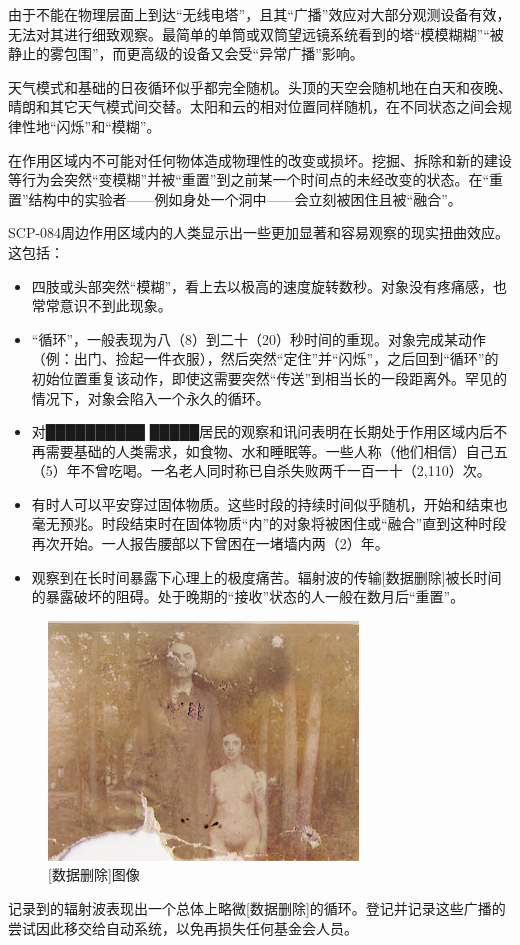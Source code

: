 \hr

由于不能在物理层面上到达“无线电塔”，且其“广播”效应对大部分观测设备有效，无法对其进行细致观察。最简单的单筒或双筒望远镜系统看到的塔“模模糊糊”“被静止的雾包围”，而更高级的设备又会受“异常广播”影响。

\hr

天气模式和基础的日夜循环似乎都完全随机。头顶的天空会随机地在白天和夜晚、晴朗和其它天气模式间交替。太阳和云的相对位置同样随机，在不同状态之间会规律性地“闪烁”和“模糊”。

\hr

在作用区域内不可能对任何物体造成物理性的改变或损坏。挖掘、拆除和新的建设等行为会突然“变模糊”并被“重置”到之前某一个时间点的未经改变的状态。在“重置”结构中的实验者——例如身处一个洞中——会立刻被困住且被“融合”。

\hr

SCP-084周边作用区域内的人类显示出一些更加显著和容易观察的现实扭曲效应。这包括：

\begin{itemize}
\item 四肢或头部突然“模糊”，看上去以极高的速度旋转数秒。对象没有疼痛感，也常常意识不到此现象。
\item “循环”，一般表现为八（8）到二十（20）秒时间的重现。对象完成某动作（例：出门、捡起一件衣服），然后突然“定住”并“闪烁”，之后回到“循环”的初始位置重复该动作，即使这需要突然“传送”到相当长的一段距离外。罕见的情况下，对象会陷入一个永久的循环。
\item 对██████████ █████居民的观察和讯问表明在长期处于作用区域内后不再需要基础的人类需求，如食物、水和睡眠等。一些人称（他们相信）自己五（5）年不曾吃喝。一名老人同时称已自杀失败两千一百一十（2,110）次。
\item 有时人可以平安穿过固体物质。这些时段的持续时间似乎随机，开始和结束也毫无预兆。时段结束时在固体物质“内”的对象将被困住或“融合”直到这种时段再次开始。一人报告腰部以下曾困在一堵墙内两（2）年。
\item 观察到在长时间暴露下心理上的极度痛苦。辐射波的传输{[}数据删除]被长时间的暴露破坏的阻碍。处于晚期的“接收”状态的人一般在数月后“重置”。
\end{itemize}

\begin{figure}[H]
    \centering
    \includegraphics[width=0.5\linewidth]{images/log-084-a4-3.jpg}
    \caption*{{[}数据删除]图像}
\end{figure}

\hr

记录到的辐射波表现出一个总体上略微{[}数据删除]的循环。登记并记录这些广播的尝试因此移交给自动系统，以免再损失任何基金会人员。
